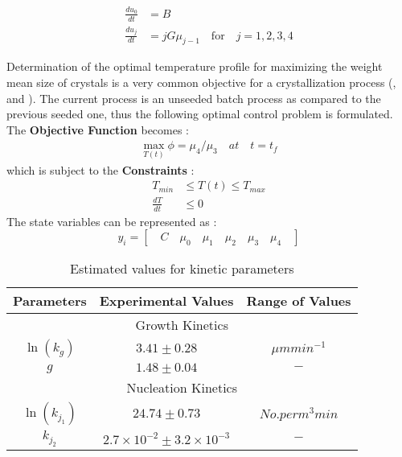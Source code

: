 \documentclass[3p,times,authoryear]{elsarticle}
\begin{document}
\begin{align} 
\frac{du_{0}}{dt} &= B  \label{ceq1} \\
\frac{du_{j}}{dt} &= jG\mu_{j-1} \label{ceq2} \quad\text{for}\quad j = 1,2,3,4
\end{align}
\par
Determination of the optimal temperature profile for maximizing the weight mean size of crystals is a very common objective for a crystallization process (\cite{mao2010kinetics}, \cite{nowee} and \cite{yang2013model}). The current process is an unseeded batch process as compared to the previous seeded one, thus the following optimal control problem is formulated.  
The \textbf{Objective Function} becomes :
\begin{align}
\max_{T(t)}	\phi = \mu_{4}/\mu_{3} \quad at \quad t = t_{f} \label{appobjective}
\end{align}
which is subject to the \textbf{Constraints} : 
\begin{align} \label{appconstraints}
T_{min} &\leqslant T(t) \leqslant T_{max} \\
\frac{dT}{dt} &\leqslant 0
\end{align}
The state variables can be represented as :
\begin{equation*}
y_{i} = \left[\quad C \quad \mu_{0} \quad \mu_{1} \quad \mu_{2} \quad \mu_{3}\quad \mu_{4} \quad\right]  
\end{equation*}


\begin{center}
\begin{table}[!h]
\centering 
\caption{Estimated values for kinetic parameters} \label{Table4}
\begin{tabular}{|c|c|c|}
\hline
Parameters & Experimental Values & Range of Values\\
\hline
\multicolumn{3}{|c|}{Growth Kinetics} \\
\hline
$\ln(k_{g})$ & $3.41\pm 0.28$ & $\mu m min^{-1} $\\
$g$ & $1.48\pm 0.04$ & $ - $\\
\hline
\multicolumn{3}{|c|}{Nucleation Kinetics} \\
\hline
$\ln(k_{j_{1}})$ & $24.74\pm0.73$ & $No. per m^{3}min$\\ 
$k_{j_{2}}$ & $2.7\times10^{-2}\pm 3.2\times10^{-3}$ & $-$\\
\hline
\end{tabular}

\label{values}
\end{table}
\end{center}
\end{document}
